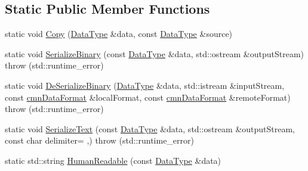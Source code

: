 \subsection*{Static Public Member Functions}
\begin{DoxyCompactItemize}
\item 
static void \hyperlink{classcmn_data_3_01vct_frame4x4_3_01__element_type_00_01__row_major_01_4_01_4_a4426479c175cd9a23317ce3c5f7035e0}{Copy} (\hyperlink{classcmn_data_3_01vct_frame4x4_3_01__element_type_00_01__row_major_01_4_01_4_abf4e17a9d0af654027bedb454326d1d2}{Data\+Type} \&data, const \hyperlink{classcmn_data_3_01vct_frame4x4_3_01__element_type_00_01__row_major_01_4_01_4_abf4e17a9d0af654027bedb454326d1d2}{Data\+Type} \&source)
\item 
static void \hyperlink{classcmn_data_3_01vct_frame4x4_3_01__element_type_00_01__row_major_01_4_01_4_ae4c46f7df40645f6ac02d410c531d761}{Serialize\+Binary} (const \hyperlink{classcmn_data_3_01vct_frame4x4_3_01__element_type_00_01__row_major_01_4_01_4_abf4e17a9d0af654027bedb454326d1d2}{Data\+Type} \&data, std\+::ostream \&output\+Stream)  throw (std\+::runtime\+\_\+error)
\item 
static void \hyperlink{classcmn_data_3_01vct_frame4x4_3_01__element_type_00_01__row_major_01_4_01_4_a88ad73d245e1903211b4bee08711279b}{De\+Serialize\+Binary} (\hyperlink{classcmn_data_3_01vct_frame4x4_3_01__element_type_00_01__row_major_01_4_01_4_abf4e17a9d0af654027bedb454326d1d2}{Data\+Type} \&data, std\+::istream \&input\+Stream, const \hyperlink{classcmn_data_format}{cmn\+Data\+Format} \&local\+Format, const \hyperlink{classcmn_data_format}{cmn\+Data\+Format} \&remote\+Format)  throw (std\+::runtime\+\_\+error)
\item 
static void \hyperlink{classcmn_data_3_01vct_frame4x4_3_01__element_type_00_01__row_major_01_4_01_4_a42f6b34c9c9c971cc769b549284e59f9}{Serialize\+Text} (const \hyperlink{classcmn_data_3_01vct_frame4x4_3_01__element_type_00_01__row_major_01_4_01_4_abf4e17a9d0af654027bedb454326d1d2}{Data\+Type} \&data, std\+::ostream \&output\+Stream, const char delimiter= \textquotesingle{},\textquotesingle{})  throw (std\+::runtime\+\_\+error)
\item 
static std\+::string \hyperlink{classcmn_data_3_01vct_frame4x4_3_01__element_type_00_01__row_major_01_4_01_4_a65a73dfe39eabd7ae911eea642daafc6}{Human\+Readable} (const \hyperlink{classcmn_data_3_01vct_frame4x4_3_01__element_type_00_01__row_major_01_4_01_4_abf4e17a9d0af654027bedb454326d1d2}{Data\+Type} \&data)
\item 

\end{DoxyCompactItemize}
